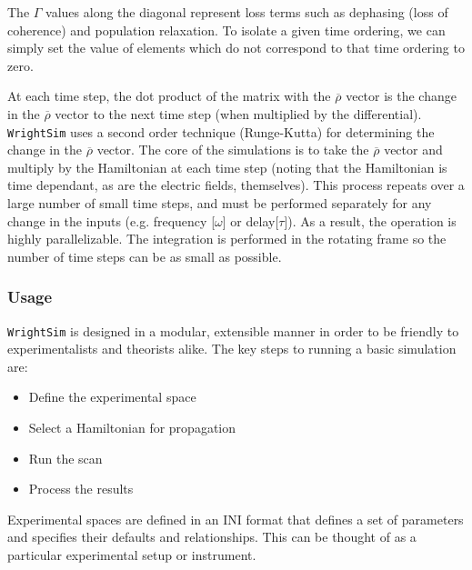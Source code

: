 The \(\Gamma\) values along the diagonal represent loss terms such as
dephasing (loss of coherence) and population relaxation. To isolate a
given time ordering, we can simply set the value of elements which do
not correspond to that time ordering to zero.

At each time step, the dot product of the matrix with the
\(\overline{\rho}\) vector is the change in the \(\overline{\rho}\)
vector to the next time step (when multiplied by the differential).
\texttt{WrightSim} uses a second order technique (Runge-Kutta)
\cite{Blanchard2006} for determining the change in the
\(\overline{\rho}\) vector. The core of the simulations is to take the
\(\overline{\rho}\) vector and multiply by the Hamiltonian at each time
step (noting that the Hamiltonian is time dependant, as are the electric
fields, themselves). This process repeats over a large number of small
time steps, and must be performed separately for any change in the
inputs (e.g. frequency {[}\(\omega\){]} or delay{[}\(\tau\){]}). As a
result, the operation is highly parallelizable. The integration is
performed in the rotating frame so the number of time steps can be as
small as possible.

\hypertarget{usage}{%
\subsubsection{Usage}\label{usage}}

\texttt{WrightSim} is designed in a modular, extensible manner in order
to be friendly to experimentalists and theorists alike. The key steps to
running a basic simulation are:

\begin{itemize}
\item
  Define the experimental space
\item
  Select a Hamiltonian for propagation
\item
  Run the scan
\item
  Process the results
\end{itemize}

Experimental spaces are defined in an INI format that defines a set of
parameters and specifies their defaults and relationships. This can be
thought of as a particular experimental setup or instrument.

